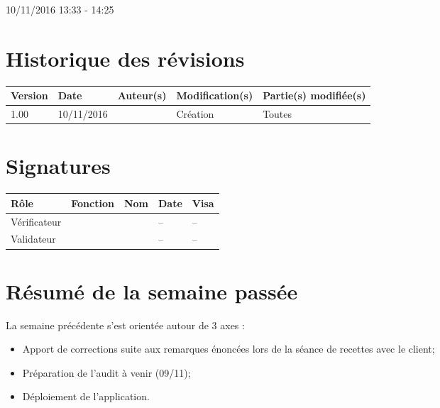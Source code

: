 \documentclass [a4paper] {article}
\begin{document}
10/11/2016			 				%
\hfill   
\hfill 	 13:33 - 14:25				%


\section*{Historique des révisions}
\begin{center}
			\begin{tabular}{| p{2.5cm} | p{3cm} | p{3cm} | p{3cm} | p{3.5cm} |}
				\hline
				\rowcolor{Gray}
				Version & Date & Auteur(s) & Modification(s) & Partie(s) modifiée(s)		 \\
				\hline
				1.00 & 10/11/2016 & \Kafui & Création & Toutes \\
				\hline			
			\end{tabular}
		\end{center}

\section*{Signatures}

		\begin{center}
			\begin{tabular}{| p{2.5cm} | p{4cm} | p{3cm} | p{3cm} | p{2.5cm} |}
				\hline
				\rowcolor{Gray}
				Rôle & Fonction & Nom & Date & Visa		 \\
				\hline
				Vérificateur & \RGC & \Melissa & -- & -- \\[30pt]
				\hline
				Validateur & \CP & \Pierre &  -- & -- \\[30pt]	
				\hline
			\end{tabular}
		\end{center}

\section{Résumé de la semaine passée}
La semaine précédente s'est orientée autour de 3 axes :  
\begin{itemize}
	\item Apport de corrections suite aux remarques énoncées lors de la séance de recettes avec le client;
	\item Préparation de l'audit à venir (09/11);
	\item Déploiement de l'application.
\end{itemize} 
\end{document}
